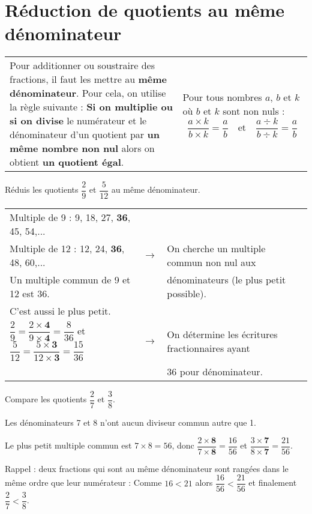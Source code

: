 \section{Réduction de quotients au même dénominateur}

\begin{aconnaitre}
\begin{tabular}{p{.6\linewidth}|p{.35\linewidth}}
Pour additionner ou soustraire des fractions, il faut les mettre au \textbf{même dénominateur}. Pour cela, on utilise la règle suivante : \textbf{Si on multiplie ou si on divise} le numérateur et le dénominateur d'un quotient par \textbf{un même nombre non nul} alors on obtient \textbf{un quotient égal}. & Pour tous nombres $a$, $b$ et $k$ 
où $b$ et $k$ sont non nuls : \[ \dfrac{a\times k}{b \times k} = \dfrac{a}{b} \quad \text{et} \quad \dfrac{a \div k}{b \div k} = \frac{a}{b} \] \\
\end{tabular}
\end{aconnaitre}
 



\begin{exemple*1}

Réduis les quotients $\dfrac{2}{9}$ et $\dfrac{5}{12}$ au même dénominateur.

\correction

\begin{tabular}{lcl}
Multiple de 9 : 9, 18, 27, \textbf{36}, 45, 54,... & &\\
Multiple de 12 : 12, 24, \textbf{36}, 48, 60,... & $\longrightarrow$ & On cherche un multiple commun non nul aux \\
Un multiple commun de 9 et 12 est 36. & & dénominateurs (le plus petit possible). \\
C'est aussi le plus petit. &  &  \\
$\dfrac{2}{9} = \dfrac{2 \times \boldsymbol{4}}{9 \times \boldsymbol{4}} = \dfrac{8}{36}$ et $\dfrac{5}{12} = \dfrac{5\times \boldsymbol{3}}{12 \times \boldsymbol{3}} = \dfrac{15}{36}$ & $\longrightarrow$ & On détermine les écritures fractionnaires ayant \\
& &  36 pour dénominateur. \\
\end{tabular}
\end{exemple*1}


\begin{exemple*1}

Compare les quotients $\dfrac{2}{7}$ et $\dfrac{3}{8}$.

\correction

Les dénominateurs 7 et 8 n'ont aucun diviseur commun autre que 1.

Le plus petit multiple commun est $7 \times  8 = 56$, donc $\dfrac{2 \times \boldsymbol{8}}{7 \times \boldsymbol{8}} = \dfrac{16}{56}$ et $\dfrac{3 \times \boldsymbol{7}}{8 \times \boldsymbol{7}} = \dfrac{21}{56}$.

Rappel : deux fractions qui sont au même dénominateur sont rangées dans le même ordre que leur numérateur : Comme $16 < 21$ alors $\dfrac{16}{56}<\dfrac{21}{56}$ et finalement $\dfrac{2}{7}<\dfrac{3}{8}$.
\end{exemple*1}



